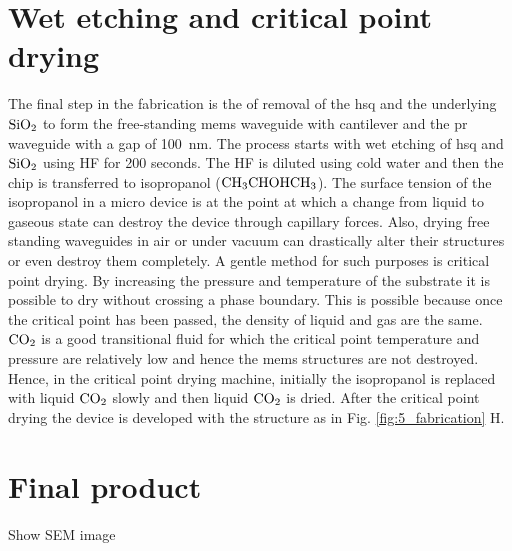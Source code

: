 \documentclass[../report.tex]{subfiles}
\begin{document}
\section{Wet etching and critical point drying}
The final step in the fabrication is the of removal of the \gls{hsq} and the underlying $\mathrm{SiO_2}$ to form the free-standing \gls{mems} waveguide with cantilever and the \gls{pr} waveguide with a gap of \SI{100}{\nano \meter}. The process starts with wet etching of \gls{hsq} and $\mathrm{SiO_2}$ using HF for 200 seconds. The HF is diluted using cold water and then the chip is transferred to isopropanol ($\mathrm{CH_3CHOHCH_3}$). The surface tension of the isopropanol in a micro device is at the point at which a change from liquid to gaseous state can destroy the device through capillary forces. Also, drying free standing waveguides in air or under vacuum can drastically alter their structures or even destroy them completely. A gentle method for such purposes is critical point drying. By increasing the pressure and temperature of the substrate it is possible to dry without crossing a phase boundary. This is possible because once the critical point has been passed, the density of liquid and gas are the same. $\mathrm{CO_2}$ is a good transitional fluid for which the critical point temperature and pressure are relatively low and hence the \gls{mems} structures are not destroyed. Hence, in the critical point drying machine, initially the isopropanol is replaced with liquid $\mathrm{CO_2}$ slowly and then liquid $\mathrm{CO_2}$ is dried. After the critical point drying the device is developed with the structure as in Fig. \ref{fig:5_fabrication} H. 

\section{Final product}

Show SEM image
\end{document}
